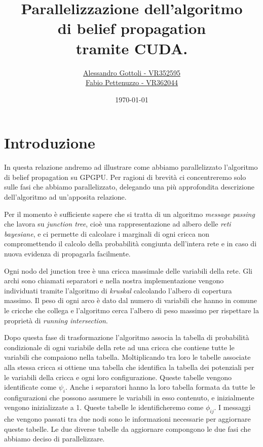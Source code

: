 \documentclass[a4paper]{article}   %
\begin{document}
\title{Parallelizzazione dell'algoritmo\\di belief propagation\\tramite CUDA.}   %
\author{\href{mailto:alessandro.gottoli@studenti.univr.it}{Alessandro Gottoli - VR352595} \\ \href{mailto:fabio.pettenuzzo@studenti.univr.it}{Fabio Pettenuzzo - VR362044}}
\date{\today}    %
\maketitle

\vspace{4cm}
\tableofcontents
\pagebreak




\section{Introduzione}             %
In questa relazione andremo ad illustrare come abbiamo parallelizzato l’algoritmo di belief propagation su GPGPU. Per ragioni di brevità ci concentreremo solo sulle fasi che abbiamo parallelizzato, delegando una più approfondita descrizione dell’algoritmo ad un’apposita relazione.

Per il momento è sufficiente sapere che si tratta di un algoritmo \emph{message passing} che lavora su \emph{junction tree}, cioè una rappresentazione ad albero delle \emph{reti bayesiane}, e ci permette di calcolare i marginali di ogni cricca non compromettendo il calcolo della probabilità congiunta dell'intera rete e in caso di nuova evidenza di propagarla facilmente.

Ogni nodo del junction tree è una cricca massimale delle variabili della rete. Gli archi sono chiamati separatori e nella nostra implementazione vengono individuati tramite l'algoritmo di \emph{kruskal} calcolando l'albero di copertura massimo. Il peso di ogni arco è dato dal numero di variabili che hanno in comune le cricche che collega e l'algoritmo cerca l'albero di peso massimo per rispettare la proprietà di \emph{running intersection}.

Dopo questa fase di trasformazione l'algoritmo associa la tabella di probabilità condizionale di ogni variabile della rete ad una cricca che contiene tutte le variabili che compaiono nella tabella. Moltiplicando tra loro le tabelle associate alla stessa cricca si ottiene una tabella che identifica la tabella dei potenziali per le variabili della cricca e ogni loro configurazione. Queste tabelle vengono identificate come $\psi_i$. Anche i separatori hanno la loro tabella formata da tutte le configurazioni che possono assumere le variabili in esso contenuto, e inizialmente vengono inizializzate a 1. Queste tabelle le identificheremo come $\phi_{ij}$.
I messaggi che vengono passati tra due nodi sono le informazioni necessarie per aggiornare queste tabelle.
Le due diverse tabelle da aggiornare compongono le due fasi che abbiamo deciso di parallelizzare.
\end{document}
